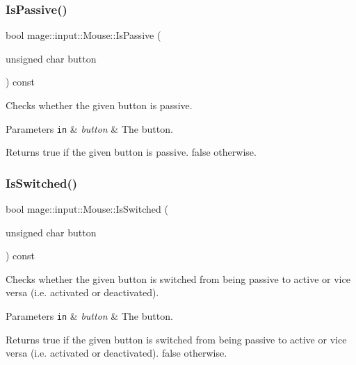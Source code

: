 \subsubsection{\texorpdfstring{Is\+Passive()}{IsPassive()}}
{\footnotesize\ttfamily bool mage\+::input\+::\+Mouse\+::\+Is\+Passive (\begin{DoxyParamCaption}\item[{unsigned char}]{button }\end{DoxyParamCaption}) const\hspace{0.3cm}{\ttfamily [noexcept]}}

Checks whether the given button is passive.


\begin{DoxyParams}[1]{Parameters}
\mbox{\tt in}  & {\em button} & The button. \\
\hline
\end{DoxyParams}
\begin{DoxyReturn}{Returns}
{\ttfamily true} if the given button is passive. {\ttfamily false} otherwise. 
\end{DoxyReturn}
\mbox{\label{classmage_1_1input_1_1_mouse_a1c4d91c2aa67ea7fa5f899011890d279}} 
\subsubsection{\texorpdfstring{Is\+Switched()}{IsSwitched()}}
{\footnotesize\ttfamily bool mage\+::input\+::\+Mouse\+::\+Is\+Switched (\begin{DoxyParamCaption}\item[{unsigned char}]{button }\end{DoxyParamCaption}) const\hspace{0.3cm}{\ttfamily [noexcept]}}

Checks whether the given button is switched from being passive to active or vice versa (i.\+e. activated or deactivated).


\begin{DoxyParams}[1]{Parameters}
\mbox{\tt in}  & {\em button} & The button. \\
\hline
\end{DoxyParams}
\begin{DoxyReturn}{Returns}
{\ttfamily true} if the given button is switched from being passive to active or vice versa (i.\+e. activated or deactivated). {\ttfamily false} otherwise. 
\end{DoxyReturn}
\mbox{\label{classmage_1_1input_1_1_mouse_af4ce64a7808af28c80bc9c01c83f7d14}} 
